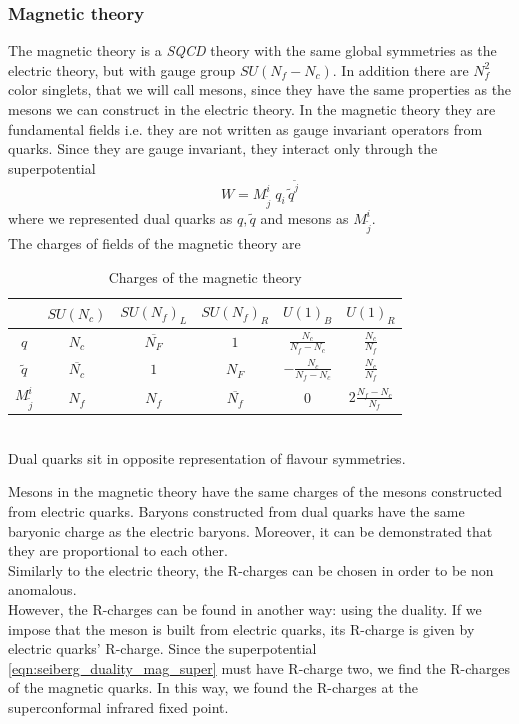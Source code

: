 \subsubsection{Magnetic theory}
The magnetic theory is a \emph{SQCD} theory with the same global symmetries as the electric theory, but with gauge group $SU(N_f - N_c)$. 
In addition there are $N_f^2$ color singlets, that we will call mesons, since they have the same properties as the mesons we can construct in the electric theory.
In the magnetic theory they are fundamental fields i.e. they are not written as gauge invariant operators from quarks. 
Since they are gauge invariant, they interact only through the superpotential
\begin{equation}
 W  = M^i_{\tilde{j}} \; q_i \, \tilde{q}^{\tilde{j}}
 \label{eqn:seiberg_duality_mag_super}
\end{equation}
where we represented dual quarks as $q,\tilde{q}$ and mesons as $M^i_{\tilde{j}} $.\\
The charges of fields of the magnetic theory are
\begin{table}[h]
 \begin{tabular}{c | c |  c c c c }
 & $SU(N_c) $& $SU(N_f)_L$  &$SU(N_f)_R $  & $U(1)_B$ &  $U(1)_R$ \\
\hline
$q$ & $N_c$ & $\overline{N_F}$ & $1$   &  $ \frac{N_c}{N_f-N_c} $  & $ \frac{N_c}{N_f}$  \\
$\tilde{q}$ &$\overline{N_c} $ &  $1$ & ${ N_F}$   & $- \frac{N_c}{N_f-N_c}$   &  $ \frac{N_c}{N_f}$   \\	 
$M^i_{\tilde{j}} $ & $N_f$ & $N_f$ & $\overline{N_f} $ & $0$ & $ 2 \frac{N_f - N_c}{N_f} $
 \end{tabular}
	\centering
 \caption{Charges of the magnetic theory}
\end{table}\\
Dual quarks sit in opposite representation of flavour symmetries. 

Mesons in the magnetic theory have the same charges of the mesons constructed from electric quarks.
Baryons constructed from dual quarks have the same baryonic charge as the electric baryons.
Moreover, it can be demonstrated that they are proportional to each other.\\
Similarly to the electric theory, the R-charges can be chosen in order to be non anomalous.\\
However, the R-charges can be found in another way: using the duality.
If we impose that the meson is built from electric quarks, its R-charge is given by electric quarks' R-charge.
Since the superpotential \eqref{eqn:seiberg_duality_mag_super} must have R-charge two, we find the R-charges of the magnetic quarks.
In this way, we found the R-charges at the superconformal infrared fixed point.

